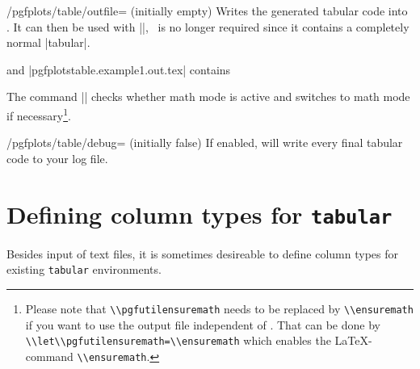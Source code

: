 \begin{key}{/pgfplots/table/outfile= (initially empty)}
	Writes the generated tabular code into . It can then be used with ||, \PGFPlotstable\ is no longer required since it contains a completely normal |tabular|.
\begin{codeexample}[]
\end{codeexample}
and |pgfplotstable.example1.out.tex| contains
%


The command |\pgfutilensuremath| checks whether math mode is active and switches to math mode if necessary\footnote{Please note that \lstinline{\\pgfutilensuremath} needs to be replaced by \lstinline{\\ensuremath} if you want to use the output file independent of \PGF. That can be done by \lstinline{\\let\\pgfutilensuremath=\\ensuremath} which enables the \LaTeX-command \lstinline{\\ensuremath}.}.
\end{key}

\begin{key}{/pgfplots/table/debug= (initially false)}
	If enabled, will write every final tabular code to your log file.
\end{key}

\section{Defining column types for \texttt{tabular}}
Besides input of text files, it is sometimes desireable to define column types for existing \texttt{tabular} environments.

